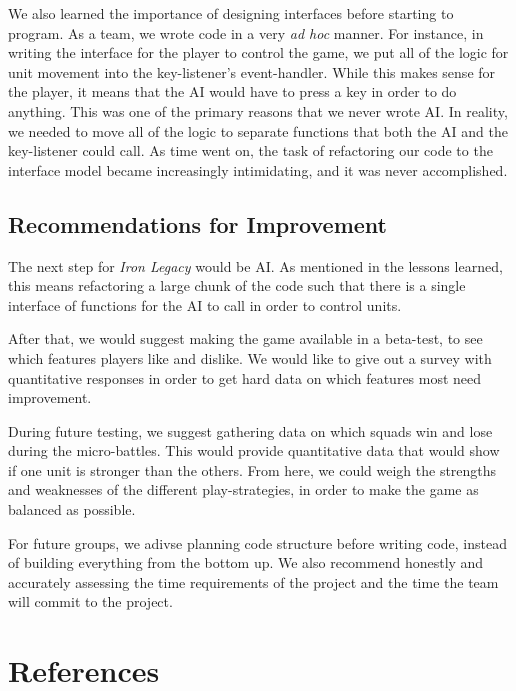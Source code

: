 \documentclass{article}
\begin{document}
We also learned the importance of designing interfaces before starting to
    program.
    As a team, we wrote code in a very \emph{ad hoc} manner.
    For instance, in writing the interface for the player to control the game,
    we put all of the logic for unit movement into the key-listener's
    event-handler.
    While this makes sense for the player, it means that the AI would have
    to press a key in order to do anything.
    This was one of the primary reasons that we never wrote AI.
    In reality, we needed to move all of the logic to separate functions that
    both the AI and the key-listener could call.
    As time went on, the task of refactoring our code to the interface model
    became increasingly intimidating, and it was never accomplished.

\subsection*{Recommendations for Improvement}

The next step for \emph{Iron Legacy} would be AI.
    As mentioned in the lessons learned, this means refactoring a large
    chunk of the code such that there is a single interface
    of functions for the AI to call in order to control units.

After that, we would suggest making the game available in a beta-test,
    to see which features players like and dislike.
    We would like to give out a survey with quantitative
    responses in order to get hard data on which features most need
    improvement.

During future testing, we suggest gathering data on which squads
    win and lose during the micro-battles.
    This would provide quantitative data that would show if one unit
    is stronger than the others.
    From here, we could weigh the strengths and
    weaknesses of the different play-strategies, in order to make
    the game as balanced as possible.

For future groups, we adivse planning code structure before writing code,
    instead of building everything from the bottom up. We also recommend
    honestly and accurately assessing the time requirements of the project
    and the time the team will commit to the project.
\clearpage

\section*{References}
\end{document}
